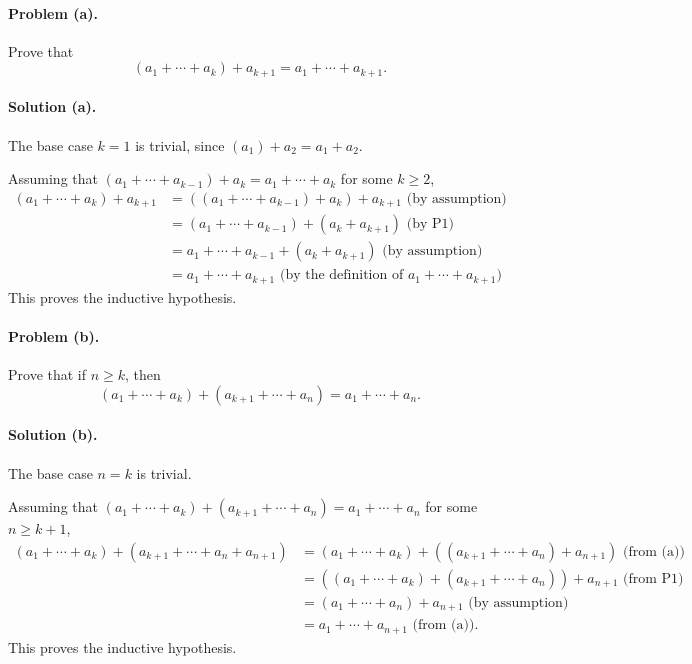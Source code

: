 \documentclass{article}
\begin{document}
\paragraph{Problem (a).} Prove that \begin{equation*}
  (a_1 + \cdots + a_k) + a_{k+1} = a_1 + \cdots + a_{k+1}.
\end{equation*}

\paragraph{Solution (a).} The base case $k = 1$ is trivial, since $(a_1) + a_2
= a_1 + a_2$.

Assuming that $(a_1 + \cdots + a_{k-1}) + a_k = a_1 + \cdots + a_k$ for some $k
\geq 2$, \begin{align*}
  (a_1 + \cdots + a_k) + a_{k+1} &= ((a_1 + \cdots + a_{k-1}) + a_k) + a_{k+1}
  \text{ (by assumption)} \\
    &= (a_1 + \cdots + a_{k-1}) + (a_k + a_{k+1}) \text{ (by P1)} \\
    &= a_1 + \cdots + a_{k-1} + (a_k + a_{k+1}) \text{ (by assumption)} \\
    &= a_1 + \cdots + a_{k+1} \text{ (by the definition of } a_1 + \cdots +
    a_{k+1} \text{)}
\end{align*} This proves the inductive hypothesis.

\paragraph{Problem (b).} Prove that if $n \geq k$, then \begin{equation*}
  (a_1 + \cdots + a_k) + (a_{k+1} + \cdots + a_n) = a_1 + \cdots + a_n.
\end{equation*}

\paragraph{Solution (b).} The base case $n = k$ is trivial.

Assuming that $(a_1 + \cdots + a_k) + (a_{k+1} + \cdots + a_n) = a_1 + \cdots +
a_n$ for some $n \geq k + 1$, \begin{align*}
  (a_1 + \cdots + a_k) + (a_{k+1} + \cdots + a_n + a_{n+1}) &= (a_1 + \cdots +
  a_k) + ((a_{k+1} + \cdots + a_n) + a_{n+1}) \text{ (from (a))} \\
    &= ((a_1 + \cdots + a_k) + (a_{k+1} + \cdots + a_n)) + a_{n+1} \text{ (from
    P1)} \\
    &= (a_1 + \cdots + a_n) + a_{n+1} \text{ (by assumption)} \\
    &= a_1 + \cdots + a_{n+1} \text{ (from (a))}.
\end{align*} This proves the inductive hypothesis.
\end{document}
